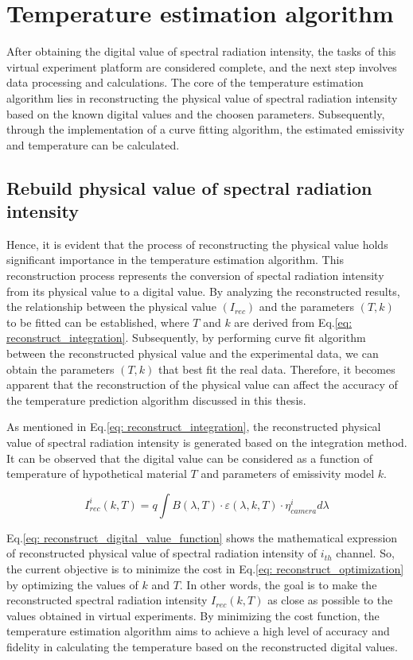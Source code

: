 \section{Temperature estimation algorithm}
After obtaining the digital value of spectral radiation intensity, 
the tasks of this virtual experiment platform are considered complete, 
and the next step involves data processing and calculations. The core 
of the temperature estimation algorithm lies in reconstructing the physical 
value of spectral radiation intensity based on the known digital values and 
the choosen parameters. 
Subsequently, through the implementation of a curve fitting algorithm, the 
estimated emissivity and temperature can be calculated.


\subsection{Rebuild physical value of spectral radiation intensity}
Hence, it is evident that the process of reconstructing the physical value holds 
significant importance in the temperature estimation algorithm. This reconstruction 
process represents the conversion of spectal radiation intensity from its physical value to a 
digital value. By analyzing the reconstructed results, the 
relationship between the physical value $(I_{rec})$ and the parameters $(T, k)$ to be fitted can be established, 
where $T$ and $k$ are derived from Eq.\ref{eq: reconstruct_integration}. Subsequently, 
by performing curve 
fit algorithm between the reconstructed physical value and the experimental data, we 
can obtain the parameters $(T, k)$ that best fit the real data. Therefore, it 
becomes apparent that the reconstruction of the physical value can affect 
the accuracy of the temperature prediction algorithm discussed in this thesis.


As mentioned in Eq.\ref{eq: reconstruct_integration}, the reconstructed physical value 
of spectral radiation intensity is generated based on the integration method. It can 
be observed that the digital value can be considered as a function of temperature of 
hypothetical material $T$ and parameters of emissivity model $k$.


\begin{equation}
  \label{eq: reconstruct_digital_value_function}
  I_{rec}^i (k, T) = q \int B(\lambda, T) \cdot \varepsilon(\lambda, k, T) 
  \cdot \eta_{camera}^i d\lambda
\end{equation}


Eq.\ref{eq: reconstruct_digital_value_function} shows the mathematical expression 
of reconstructed physical value of spectral radiation intensity of $i_{th}$ channel.
So, the current objective is to minimize the cost in Eq.\ref{eq: reconstruct_optimization} 
by optimizing the values of $k$ and $T$. In other words, the goal is to make the 
reconstructed spectral radiation intensity $I_{rec}(k, T)$ as close as possible 
to the values obtained in virtual experiments. By minimizing the cost function, 
the temperature estimation algorithm aims to achieve a high level of accuracy 
and fidelity in calculating the temperature based on the reconstructed 
digital values.


